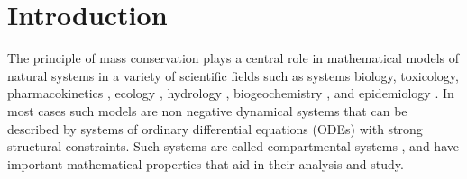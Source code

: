 \section{Introduction}
The principle of mass conservation plays a central role in mathematical models
of natural systems in a variety of scientific fields such as systems biology,
toxicology, pharmacokinetics \citep{Anderson1983}, ecology
\citep{Eriksson1971ARoEaS, Rodhe1979Tellus, Matis1979, Manzoni2009SBB},
hydrology \citep{Nash1957IASH, Botter2011GRL, Harman2014GRL}, biogeochemistry
\citep{Manzoni2009SBB, Sierra2015EM}, and epidemiology \citep{Jacquez1993SIAM}.
In most cases such models are non negative dynamical systems that can be
described by systems of ordinary differential equations (ODEs) with
strong structural constraints.  Such systems are called compartmental systems \citep{Anderson1983, Jacquez1993SIAM, Walter1999, Haddad2010}, and have
important mathematical properties that aid in their analysis and study.
\\
